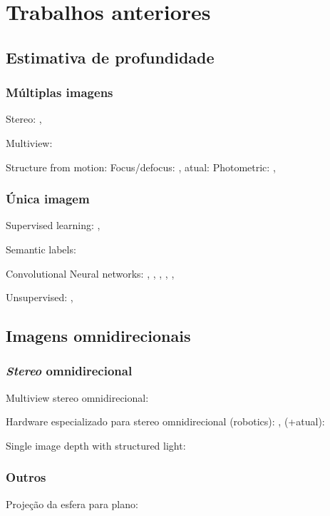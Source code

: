 \documentclass[cic,tc]{iiufrgs}
\begin{document}
\chapter{Trabalhos anteriores}

\section{Estimativa de profundidade}

\subsection{Múltiplas imagens}
Stereo: \citet{stereoSurvey2001},  \citet{stereoSurvey2016}

Multiview: \citet{multiViewStereo2015}

Structure from motion: \citet{structMotion2016}
Focus/defocus: \citet{defocus1987}, atual: \citet{defocus2015}
Photometric: \citet{photometricStereo1989}, \citet{photometricStereo2012}

\subsection{Única imagem}

Supervised learning: \citet{Saxena2005}, \citet{Saxena2008}

Semantic labels: \citet{Liu2010}

Convolutional Neural networks: 
\citet{Fayao2015}, \citet{Fayao2016}, \citet{Eigen2014}, \citet{Eigen2015}, \citet{Kuznietsov2017}, \citet{Li2017}

Unsupervised: \citet{Godard2016}, \citet{Zhou2017}


\section{Imagens omnidirecionais}

\subsection{\textit{Stereo} omnidirecional}
Multiview stereo omnidirecional: \citet{Li2001}

Hardware especializado para stereo omnidirecional (robotics): \citet{gluckman1998}, \citet{Koyasu2001} (+atual): \citet{Lin2014}

Single image depth with structured light: \citet{Orghidan2005}

\subsection{Outros}
Projeção da esfera para plano: \citet{sun360}
\end{document}
